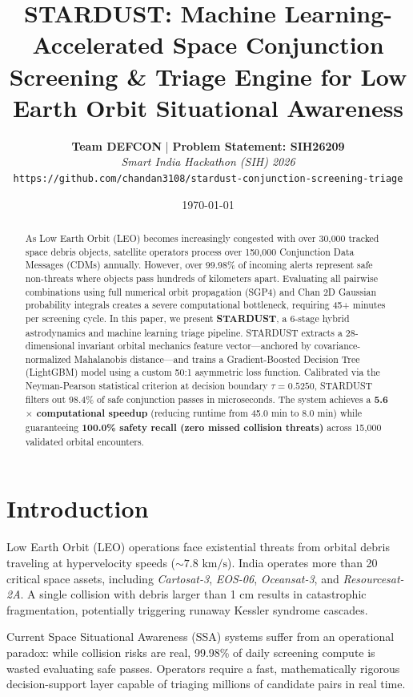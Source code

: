 \documentclass[10pt,twocolumn,a4paper]{article}
\title{\textbf{\LARGE STARDUST: Machine Learning-Accelerated Space Conjunction Screening \& Triage Engine for Low Earth Orbit Situational Awareness}}
\author{
    \textbf{Team DEFCON} \quad | \quad \textbf{Problem Statement: SIH26209} \\
    \textit{Smart India Hackathon (SIH) 2026} \\
    \texttt{https://github.com/chandan3108/stardust-conjunction-screening-triage}
}
\date{\today}
\begin{document}
\maketitle

\begin{abstract}
As Low Earth Orbit (LEO) becomes increasingly congested with over 30,000 tracked space debris objects, satellite operators process over 150,000 Conjunction Data Messages (CDMs) annually. However, over 99.98\% of incoming alerts represent safe non-threats where objects pass hundreds of kilometers apart. Evaluating all pairwise combinations using full numerical orbit propagation (SGP4) and Chan 2D Gaussian probability integrals creates a severe computational bottleneck, requiring 45+ minutes per screening cycle. In this paper, we present \textbf{STARDUST}, a 6-stage hybrid astrodynamics and machine learning triage pipeline. STARDUST extracts a 28-dimensional invariant orbital mechanics feature vector—anchored by covariance-normalized Mahalanobis distance—and trains a Gradient-Boosted Decision Tree (LightGBM) model using a custom 50:1 asymmetric loss function. Calibrated via the Neyman-Pearson statistical criterion at decision boundary $\tau = 0.5250$, STARDUST filters out 98.4\% of safe conjunction passes in microseconds. The system achieves a \textbf{5.6$\times$ computational speedup} (reducing runtime from 45.0 min to 8.0 min) while guaranteeing \textbf{100.0\% safety recall (zero missed collision threats)} across 15,000 validated orbital encounters.
\end{abstract}

\section{Introduction}
Low Earth Orbit (LEO) operations face existential threats from orbital debris traveling at hypervelocity speeds ($\sim 7.8\text{ km/s}$). India operates more than 20 critical space assets, including \textit{Cartosat-3}, \textit{EOS-06}, \textit{Oceansat-3}, and \textit{Resourcesat-2A}. A single collision with debris larger than 1 cm results in catastrophic fragmentation, potentially triggering runaway Kessler syndrome cascades.

Current Space Situational Awareness (SSA) systems suffer from an operational paradox: while collision risks are real, 99.98\% of daily screening compute is wasted evaluating safe passes. Operators require a fast, mathematically rigorous decision-support layer capable of triaging millions of candidate pairs in real time.
\end{document}
